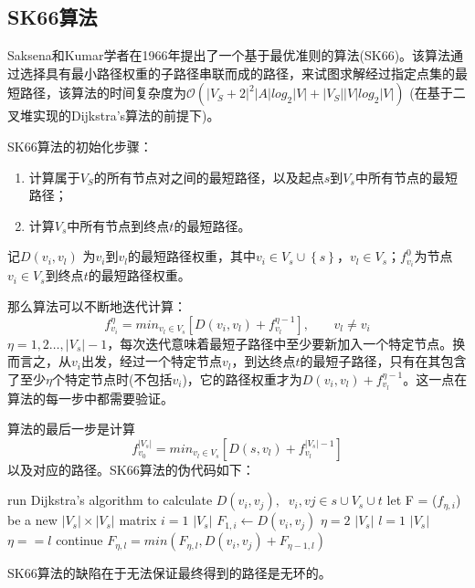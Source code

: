 \documentclass[UTF8]{ctexart}
\begin{document}
\subsection{SK66算法}
Saksena和Kumar学者在1966年提出了一个基于最优准则的算法(SK66)。该算法通过选择具有最小路径权重的子路径串联而成的路径，来试图求解经过指定点集的最短路径，该算法的时间复杂度为$ \mathcal{O}\left ( \left | V_{S}+2 \right |^{2}\left | A \right |log_{2}\left | V \right | +\left | V_{S} \right |\left | V \right |log_{2}\left | V \right |\right )$ (在基于二叉堆实现的Dijkstra's算法的前提下)。\par
SK66算法的初始化步骤：\par
\begin{enumerate}[\indent 1)]
	\item 计算属于$V_{S}$的所有节点对之间的最短路径，以及起点$s$到$V_{s}$中所有节点的最短路径；
	\item 计算$V_{s}$中所有节点到终点$t$的最短路径。
\end{enumerate}
\par
记$ D\left ( v_{i},v_{l} \right ) $ 为$v_{i}$到$v_{l}$的最短路径权重，其中$v_{i}\in V_{s} \cup \left \{ s \right \}$，$v_{l} \in V_{s}$；$f_{v_{i}}^{0}$为节点$v_{i}\in V_{s}$到终点$t$的最短路径权重。\par
那么算法可以不断地迭代计算：
\begin{equation}
f_{v_{i}}^{\eta } = min_{v_{l}\in V_{s}}\left [ D\left ( v_{i},v_{l} \right )+f_{v_{l}}^{\eta -1} \right ],\; \; \; \; \; \; \: v_{l}\neq v_{i}
\end{equation}
$\eta = 1,2\dots,|V_{s}|-1$，每次迭代意味着最短子路径中至少要新加入一个特定节点。换而言之，从$v_{i}$出发，经过一个特定节点$v_{l}$，到达终点$t$的最短子路径，只有在其包含了至少$\eta$个特定节点时(不包括$v_{i}$)，它的路径权重才为$D\left ( v_{i},v_{l} \right )+f_{v_{l}}^{\eta -1}$。这一点在算法的每一步中都需要验证。\par
算法的最后一步是计算
\begin{equation}
f_{v_{0}}^{\left |V_{s}  \right | } = min_{v_{l}\in V_{s}}\left [ D\left ( s,v_{l} \right )+f_{v_{l}}^{\left | V_{s} \right | -1} \right ]
\end{equation}
以及对应的路径。SK66算法的伪代码如下： \par
\begin{codebox}[\indent ]
\li	run Dijkstra's algorithm to calculate $D(v_i,v_j),\; \;v_{i},v{j} \in s\cup V_{s}\cup t$
\li	let F = ($f_{\eta,i}$) be a new $|V_{s}| \times |V_{s}|$ matrix
\li \For $i=1$ \To $|V_{s}|$						
\li 		 \Do $F_{1,i} \gets D(v_i,v_j)$			
		\End		                              
\li \For $\eta=2$ \To $|V_{s}|$		
\li 		\Do
 		\For $l=1$ \To $|V_{s}|$				
\li 				\If $\eta==l$							
\li 				\Then		continue							
\li 				\Else $F_{\eta,l} = min(F_{\eta,l},D(v_i,v_j)+F_{\eta -1,l}) $	
	  \End 				
\end{codebox}
\par 
SK66算法的缺陷在于无法保证最终得到的路径是无环的。\par
\end{document}
